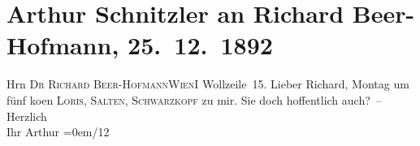 

         
         \renewcommand{\erwaehntePersonen}{Personen: Richard Beer-Hofmann, Hugo von Hofmannsthal, Felix Salten, Gustav Schwarzkopf}
         \renewcommand{\erwaehnteOrte}{Orte: Wien, Wollzeile}
         \renewcommand{\erwaehnteWerke}{}
               \section[Arthur Schnitzler an Richard Beer-Hofmann, 25. 12. 1892]{ Arthur Schnitzler an Richard Beer-Hofmann, 25. 12. 1892}\nopagebreak{}\rehead{ }\begin{ledgroupsized}[t]{13cm}\normalsize\beginnumbering \toendnotes[C]{\smallbreak\pagebreak[2]} 
\pstart{}{\pb}Hrn \textsc{Dr Richard
                     Beer-Hofmann}\pend{}\pstart{}\textsc{Wien}\pend{}\pstart{}I Wollzeile 15.\pend{}{\bigskip}\pstart
           \noindent{}{\pb}Lieber Richard, Montag um fünf ko{\geminationm}en \textsc{Loris}, \textsc{Salten}, \textsc{Schwarzkopf} zu mir. Sie doch hoffentlich auch? –\pend
           \pstart
           Herzlich{\\[\baselineskip]}Ihr \spacefill\mbox{Arthur}\pend
           \leftskip=0em{}/12\pend
           
         
         \endnumbering{}\end{ledgroupsized}  \newcommand{\dateiname}{L00145}\newcommand{\titel}{Arthur Schnitzler an Richard Beer-Hofmann, 25. 12. 1892}\newcommand{\editorInnen}{Martin Anton Müller und Gerd-Hermann Susen}
      